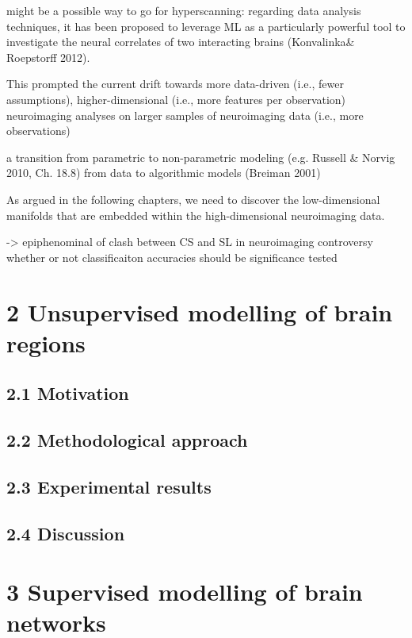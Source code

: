 \documentclass[authoryear,review,3p]{elsarticle}
\begin{document}
might be a possible way to go for hyperscanning:
regarding data analysis techniques, it has been proposed to leverage ML as a particularly powerful tool to investigate the neural correlates of two interacting brains (Konvalinka\& Roepstorff 2012).








This prompted the current drift towards more data-driven (i.e., fewer assumptions), higher-dimensional (i.e., more features per observation) neuroimaging analyses on larger samples of neuroimaging data (i.e., more observations)

a transition from parametric to non-parametric modeling (e.g. Russell \& Norvig 2010, Ch. 18.8)
from data to algorithmic models (Breiman 2001)


As argued in the following chapters,
we need to discover
the low-dimensional manifolds that are
embedded within the high-dimensional neuroimaging data.

-> epiphenominal of clash between CS and SL in neuroimaging
controversy whether or not classificaiton accuracies should be significance tested




\section*{2 Unsupervised modelling of brain regions}

\subsection*{2.1 Motivation}
\subsection*{2.2 Methodological approach}
\subsection*{2.3 Experimental results}
\subsection*{2.4 Discussion}


\bigskip
\section*{3 Supervised modelling of brain networks}
\end{document}
